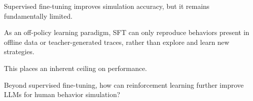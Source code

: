 \documentclass[scheme=plain,aspectratio=169]{beamer}
\begin{document}






\iffalse  
\begin{frame}[c]
  Supervised fine-tuning improves simulation accuracy, but it remains fundamentally limited.

  As an off-policy learning paradigm, SFT can only reproduce behaviors present in offline data or teacher-generated traces, rather than explore and learn new strategies.

  This places an inherent ceiling on performance.

  Beyond supervised fine-tuning, how can reinforcement learning further improve LLMs for human behavior simulation?
\end{frame}
\end{document}
